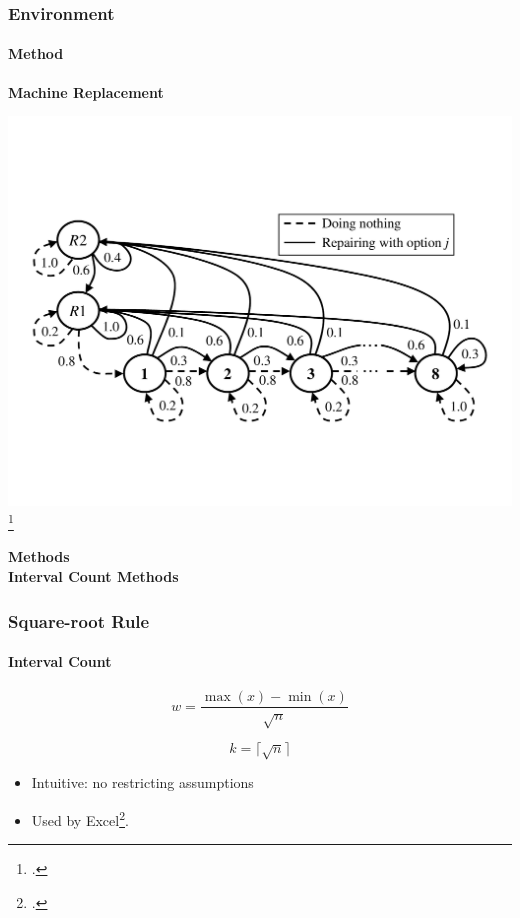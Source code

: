 \documentclass[mathserif]{beamer}
\begin{document}
    \begin{frame}
        \frametitle{Environment}
        \framesubtitle{Method}

        \large {\textbf{Machine Replacement}}

        \center \includegraphics[scale=0.25]{res/machine-replacement-mdp.pdf}\let\thefootnote\relax\footcite{Delage2010}

    \end{frame}


    \begin{frame}
        \Huge \textbf{Methods} \\
        \qquad \LARGE \textbf{Interval Count Methods}
    \end{frame}


    \begin{frame}
        \frametitle{Square-root Rule}
        \framesubtitle{Interval Count}

        \begin{equation}
            \label{eq:square_root_method_width}
            w = \frac{\max(x) - \min(x)}{\sqrt{n}}
        \end{equation}

        \begin{equation}
            \label{eq:square_root_method_count}
            k = \lceil \sqrt{n} \rceil
        \end{equation}

        \begin{itemize}
            \item Intuitive: no restricting assumptions
            \item Used by Excel\footcite{ExcelHistogram}.
        \end{itemize}


    \end{frame}
\end{document}
